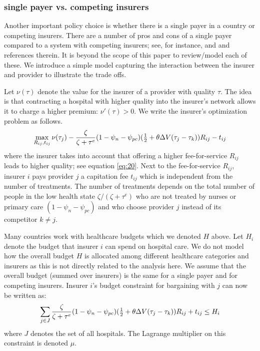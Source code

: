 \documentclass[a4paper,12pt]{article}
\begin{document}
\subsubsection{single payer vs. competing insurers}
\label{sec:org3b27027}

Another important policy choice is whether there is a single payer in a country or competing insurers. There are a number of pros and cons of a single payer compared to a system with competing insurers; see, for instance, \cite{OberlanderSinglePayer} and \cite{BICHAY2020113454} and references therein. It is beyond the scope of this paper to review/model each of these. We introduce a simple model capturing the interaction between the insurer and provider to illustrate the trade offs.

Let \(\nu(\tau)\) denote the value for the insurer of a provider with quality \(\tau\). The idea is that contracting a hospital with higher quality into the insurer's network allows it to charge a higher premium: \(\nu'(\tau) > 0\). We write the insurer's optimization problem as follows.
\begin{equation}
\label{eq:36a}
\max_{R_{ij},t_{ij}} \nu(\tau_j) - \frac{\zeta}{\zeta+\tau^e}(1-\psi_n-\psi_{pc}) (\textstyle{1\over 2}+\theta\Delta V(\tau_j-\tau_k) )R_{ij} - t_{ij}
\end{equation}
where the insurer takes into account that offering a higher fee-for-service \(R_{ij}\) leads to higher quality; see equation \eqref{eq:20}. Next to the fee-for-service \(R_{ij}\), insurer \(i\) pays provider \(j\) a capitation fee \(t_{ij}\) which is independent from the number of treatments. The number of treatments depends on the total number of people in the low health state \(\zeta/(\zeta+\tau^e)\) who are not treated by nurses or primary care \((1-\psi_n-\psi_{pc})\) and who choose provider \(j\) instead of its competitor \(k \neq j\).

Many countries work with healthcare budgets which we denoted \(H\) above. Let \(H_i\) denote the budget that insurer \(i\) can spend on hospital care. We do not model how the overall budget \(H\) is allocated among different healthcare categories and insurers as this is not directly related to the analysis here. We assume that the overall budget (summed over insurers) is the same for a single payer and for competing insurers. Insurer \(i\)'s budget constraint for bargaining with \(j\) can now be written as:
\begin{equation}
\label{eq:35}
\sum_{j \in J} \frac{\zeta}{\zeta+\tau^e}(1-\psi_n-\psi_{pc}) (\textstyle{1\over 2}+\theta\Delta V(\tau_j-\tau_k) )R_{ij} + t_{ij} \leq H_i
\end{equation}
where \(J\) denotes the set of all hospitals. The Lagrange multiplier on this constraint is denoted \(\mu\).
\end{document}
